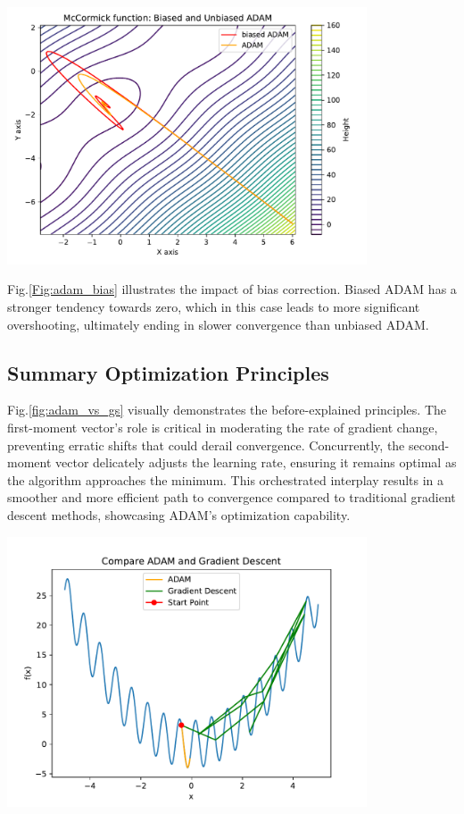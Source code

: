 \documentclass[oneside]{article}
\begin{document}
\begin{center}
    \includegraphics[width=0.8\textwidth]{report/figures/ADAM_bias.pdf}
    \label{Fig:adam_bias}
\end{center}
Fig.\ref{Fig:adam_bias} illustrates the impact of bias correction. Biased ADAM has a stronger tendency towards zero, which in this case leads to more significant overshooting, ultimately ending in slower convergence than unbiased ADAM.

\subsection{Summary Optimization Principles}
Fig.\ref{fig:adam_vs_gs} visually demonstrates the before-explained principles. The first-moment vector's role is critical in moderating the rate of gradient change, preventing erratic shifts that could derail convergence. Concurrently, the second-moment vector delicately adjusts the learning rate, ensuring it remains optimal as the algorithm approaches the minimum. This orchestrated interplay results in a smoother and more efficient path to convergence compared to traditional gradient descent methods, showcasing ADAM's optimization capability.
\begin{center}
    \includegraphics[width=0.8\textwidth]{report/figures/adam_vs_gradientdescent.pdf}
    \label{fig:adam_vs_gs}
\end{center}
\end{document}

